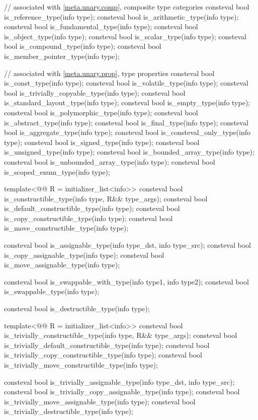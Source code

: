 \begin{codeblock}
{  // associated with \ref{meta.unary.comp}, composite type categories
  consteval bool is_reference_type(info type);
  consteval bool is_arithmetic_type(info type);
  consteval bool is_fundamental_type(info type);
  consteval bool is_object_type(info type);
  consteval bool is_scalar_type(info type);
  consteval bool is_compound_type(info type);
  consteval bool is_member_pointer_type(info type);

  // associated with \ref{meta.unary.prop}, type properties
  consteval bool is_const_type(info type);
  consteval bool is_volatile_type(info type);
  consteval bool is_trivially_copyable_type(info type);
  consteval bool is_standard_layout_type(info type);
  consteval bool is_empty_type(info type);
  consteval bool is_polymorphic_type(info type);
  consteval bool is_abstract_type(info type);
  consteval bool is_final_type(info type);
  consteval bool is_aggregate_type(info type);
  consteval bool is_consteval_only_type(info type);
  consteval bool is_signed_type(info type);
  consteval bool is_unsigned_type(info type);
  consteval bool is_bounded_array_type(info type);
  consteval bool is_unbounded_array_type(info type);
  consteval bool is_scoped_enum_type(info type);

  template<@@ R = initializer_list<info>>
    consteval bool is_constructible_type(info type, R&& type_args);
  consteval bool is_default_constructible_type(info type);
  consteval bool is_copy_constructible_type(info type);
  consteval bool is_move_constructible_type(info type);

  consteval bool is_assignable_type(info type_dst, info type_src);
  consteval bool is_copy_assignable_type(info type);
  consteval bool is_move_assignable_type(info type);

  consteval bool is_swappable_with_type(info type1, info type2);
  consteval bool is_swappable_type(info type);

  consteval bool is_destructible_type(info type);

  template<@@ R = initializer_list<info>>
    consteval bool is_trivially_constructible_type(info type, R&& type_args);
  consteval bool is_trivially_default_constructible_type(info type);
  consteval bool is_trivially_copy_constructible_type(info type);
  consteval bool is_trivially_move_constructible_type(info type);

  consteval bool is_trivially_assignable_type(info type_dst, info type_src);
  consteval bool is_trivially_copy_assignable_type(info type);
  consteval bool is_trivially_move_assignable_type(info type);
  consteval bool is_trivially_destructible_type(info type);

}
\end{codeblock}
